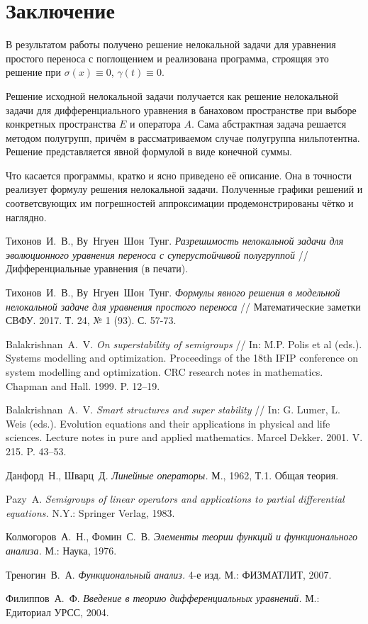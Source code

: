 \documentclass{article}
\theoremstyle{definition}
\begin{document}
\section*{Заключение}
В результатом работы получено решение нелокальной задачи для уравнения простого переноса с поглощением и реализована программа,
строящяя это решение при $\sigma(x) \equiv 0$, $\gamma(t) \equiv 0$. 

Решение исходной нелокальной задачи получается как решение нелокальной задачи для дифференциального уравнения в банаховом пространстве 
при выборе конкретных пространства $E$ и оператора $A$. Сама абстрактная задача решается методом полугрупп, причём в рассматриваемом 
случае полугруппа нильпотентна. Решение представляется явной формулой в виде конечной суммы. 

Что касается программы, кратко и ясно приведено её описание. Она в точности реализует формулу решения нелокальной задачи. Полученные графики решений и соответсвующих им погрешностей аппроксимации продемонстрированы чётко и наглядно.

\newpage

\begin{thebibliography}{99}
	

	 Тихонов~И.~В., Ву~Нгуен~Шон~Тунг.
	\emph{Разрешимость нелокальной задачи для эволюционного уравнения переноса с суперустойчивой полугруппой}
	// Дифференциальные уравнения (в печати).
	
	 Тихонов~И.~В., Ву~Нгуен~Шон~Тунг.
	\emph{Формулы явного решения в модельной нелокальной задаче для уравнения простого переноса}
	// Математические заметки СВФУ. 2017. Т. 24, № 1 (93). С. 57-73.
	
	 Balakrishnan~A.~V.
	\emph{On superstability of semigroups}
	// In: M.P. Polis et al (eds.). Systems modelling and optimization. 
	Proceedings of the 18th IFIP conference on system modelling and optimization. 
	CRC research notes in mathematics. Chapman and Hall. 1999. P. 12–19.
	
	 Balakrishnan~A.~V.
	\emph{Smart structures and super stability} 
	// In: G. Lumer, L. Weis (eds.). Evolution
	equations and their applications in physical and life sciences. Lecture notes in pure and applied
	mathematics. Marcel Dekker. 2001. V. 215. P. 43–53.
	
	 Данфорд~Н., Шварц~Д.
	\emph{Линейные операторы.} М., 1962, Т.1. Общая теория.

	 Pazy~A.
	\emph{Semigroups of linear operators and applications to partial differential equations.} N.Y.: Springer Verlag, 1983.
	
	 Колмогоров~А.~Н., Фомин~С.~В.
	\emph{Элементы теории функций и функционального анализа.} М.: Наука, 1976.
	
	 Треногин~В.~А.
	\emph{Функциональный анализ.} 4-е изд. М.: ФИЗМАТЛИТ, 2007.
	
	 Филиппов~А.~Ф.
	\emph{Введение в теорию дифференциальных уравнений.} М.: Едиториал УРСС, 2004.
\end{thebibliography}
\end{document}
